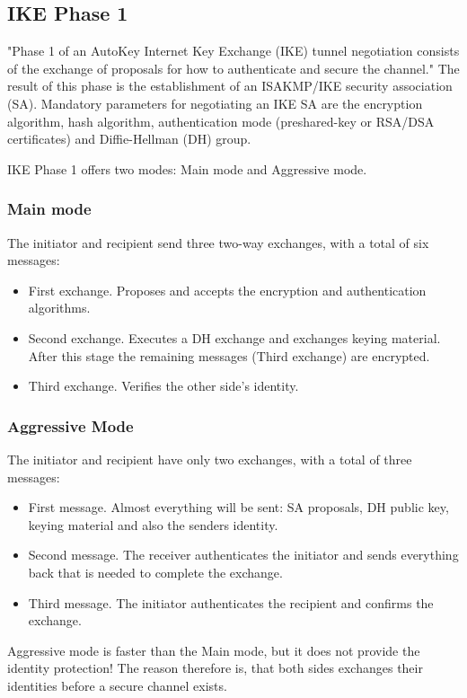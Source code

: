 \documentclass[a4paper]{report}
\begin{document}
\subsection{IKE Phase 1}
\label{ssec:Phase1}
"Phase 1 of an AutoKey Internet Key Exchange (IKE) tunnel negotiation consists of the exchange of proposals for how to authenticate and secure the channel." \parencite{JuniperNetworks2016} The result of this phase is the establishment of an ISAKMP/IKE security association (SA). Mandatory parameters for negotiating an IKE SA are the encryption algorithm, hash algorithm, authentication mode (preshared-key or RSA/DSA certificates) and Diffie-Hellman (DH) group.

IKE Phase 1 offers two modes: Main mode and Aggressive mode.
\subsubsection{Main mode}
\label{sssec:Phase1:mainMode}
The initiator and recipient send three two-way exchanges, with a total of six messages:
\begin{itemize}
	\item First exchange. Proposes and accepts the encryption and authentication algorithms.
	\item Second exchange. Executes a DH exchange and exchanges keying material. After this stage  the remaining messages (Third exchange) are encrypted.
	\item Third exchange.  Verifies the other side's identity.
\end{itemize}

\subsubsection{Aggressive Mode}
\label{sssec:Phase1:aggressiveMode}
The initiator and recipient have only two exchanges, with a total of three messages:
\begin{itemize}
	\item First message. Almost everything will be sent: SA proposals, DH public key, keying material and also the senders identity.
	\item Second message. The receiver authenticates the initiator and sends everything back that is needed to complete the exchange.
	\item Third message. The initiator authenticates the recipient and confirms the exchange.
\end{itemize}
Aggressive mode is faster than the Main mode, but it does not provide the identity protection! The reason therefore is, that both sides exchanges their identities before a secure channel exists. \parencite{JuniperNetworks2016}
\end{document}
